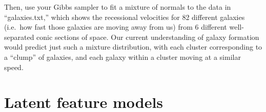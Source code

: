 \documentclass{mynotes}
\begin{document}
Then, use your Gibbs sampler to fit a mixture of normals to the data in ``galaxies.txt,'' which shows the recessional velocities for 82 different galaxies (i.e.~how fast those galaxies are moving away from us) from 6 different well-separated conic sections of space.  Our current understanding of galaxy formation would predict just such a mixture distribution, with each cluster corresponding to a ``clump'' of galaxies, and each galaxy within a cluster moving at a similar speed.



\section{Latent feature models}
\end{document}
